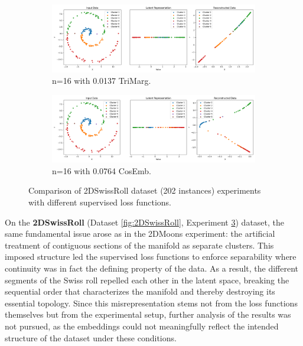 \begin{figure}[htbp]
  \centering
  \begin{subfigure}[b]{1.0\textwidth}
    \centering
    \includegraphics[width=\linewidth]{images/RQ3/tri/2DSwissRoll_16_0.0137.png}
    \caption{n=16 with 0.0137 TriMarg.}
    \label{fig:RQ3/tri/2DSwissRoll}
  \end{subfigure}
  \hfill
  \begin{subfigure}[b]{1.0\textwidth}
    \centering
    \includegraphics[width=\linewidth]{images/RQ3/cos/2DSwissRoll_16_0.0764.png}
    \caption{n=16 with 0.0764 CosEmb.}
    \label{fig:RQ3/cos/2DSwissRoll}
  \end{subfigure} 

  \caption{Comparison of 2DSwissRoll dataset (202 instances) experiments with different
supervised loss functions.}
  \label{fig:RQ3/2DSwissRoll}
\end{figure}

On the \textbf{2DSwissRoll} (Dataset \ref{fig:2DSwissRoll}, Experiment \ref{fig:RQ3/2DSwissRoll}) dataset, the same fundamental issue arose as in the 2DMoons experiment: the artificial treatment of contiguous sections of the manifold as separate clusters. This imposed structure led the supervised loss functions to enforce separability where continuity was in fact the defining property of the data. As a result, the different segments of the Swiss roll repelled each other in the latent space, breaking the sequential order that characterizes the manifold and thereby destroying its essential topology. Since this misrepresentation stems not from the loss functions themselves but from the experimental setup, further analysis of the results was not pursued, as the embeddings could not meaningfully reflect the intended structure of the dataset under these conditions.

